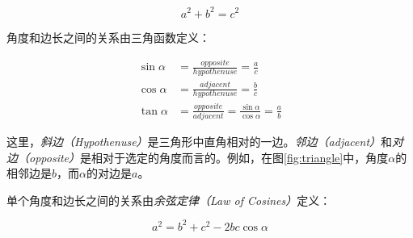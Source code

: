 \begin{equation}
a^2+b^2=c^2
\end{equation}


角度和边长之间的关系由三角函数定义：

\begin{eqnarray}
\sin{\alpha}&=\frac{opposite}{hypothenuse}=\frac{a}{c}\\
\cos{\alpha}&=\frac{adjacent}{hypothenuse}=\frac{b}{c}\\
\tan{\alpha}&=\frac{opposite}{adjacent}=\frac{\sin{\alpha}}{\cos{\alpha}}=\frac{a}{b}
\end{eqnarray} 



这里，\emph{斜边（Hypothenuse）}是三角形中直角相对的一边。\emph{邻边（adjacent）}和\emph{对边（opposite）}是相对于选定的角度而言的。例如，在图\ref{fig:triangle}中，角度$\alpha$的相邻边是$b$，而$\alpha$的对边是$a$。

单个角度和边长之间的关系由\emph{余弦定律（Law of Cosines）}定义：

\begin{equation}
a^2=b^2+c^2-2bc\cos{\alpha}
\end{equation}


